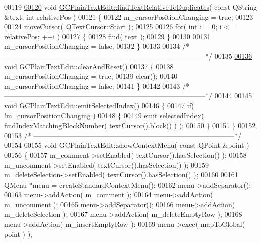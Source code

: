 \begin{DoxyCode}
00119 
\hypertarget{gcplaintextedit_8cpp_source_l00120}{}\hyperlink{class_g_c_plain_text_edit_a9c3603b9e62a7737b8d442da4a16109d}{00120} \textcolor{keywordtype}{void} \hyperlink{class_g_c_plain_text_edit_a9c3603b9e62a7737b8d442da4a16109d}{GCPlainTextEdit::findTextRelativeToDuplicates}( \textcolor{keyword}{const} QString &text, \textcolor{keywordtype}{int} 
      relativePos )
00121 \{
00122   m\_cursorPositionChanging = \textcolor{keyword}{true};
00123 
00124   moveCursor( QTextCursor::Start );
00125 
00126   \textcolor{keywordflow}{for}( \textcolor{keywordtype}{int} i = 0; i <= relativePos; ++i )
00127   \{
00128     find( text );
00129   \}
00130 
00131   m\_cursorPositionChanging = \textcolor{keyword}{false};
00132 \}
00133 
00134 \textcolor{comment}{/*
      --------------------------------------------------------------------------------------*/}
00135 
\hypertarget{gcplaintextedit_8cpp_source_l00136}{}\hyperlink{class_g_c_plain_text_edit_a974f08b952447cec6f1935140d9808b1}{00136} \textcolor{keywordtype}{void} \hyperlink{class_g_c_plain_text_edit_a974f08b952447cec6f1935140d9808b1}{GCPlainTextEdit::clearAndReset}()
00137 \{
00138   m\_cursorPositionChanging = \textcolor{keyword}{true};
00139   clear();
00140   m\_cursorPositionChanging = \textcolor{keyword}{false};
00141 \}
00142 
00143 \textcolor{comment}{/*
      --------------------------------------------------------------------------------------*/}
00144 
00145 \textcolor{keywordtype}{void} GCPlainTextEdit::emitSelectedIndex()
00146 \{
00147   \textcolor{keywordflow}{if}( !m\_cursorPositionChanging )
00148   \{
00149     emit \hyperlink{class_g_c_plain_text_edit_aa318864494827fed57e319302f74ec89}{selectedIndex}( findIndexMatchingBlockNumber( textCursor().block() ) );
00150   \}
00151 \}
00152 
00153 \textcolor{comment}{/*
      --------------------------------------------------------------------------------------*/}
00154 
00155 \textcolor{keywordtype}{void} GCPlainTextEdit::showContextMenu( \textcolor{keyword}{const} QPoint &point )
00156 \{
00157   m\_comment->setEnabled( textCursor().hasSelection() );
00158   m\_uncomment->setEnabled( textCursor().hasSelection() );
00159   m\_deleteSelection->setEnabled( textCursor().hasSelection() );
00160 
00161   QMenu *menu = createStandardContextMenu();
00162   menu->addSeparator();
00163   menu->addAction( m\_comment );
00164   menu->addAction( m\_uncomment );
00165   menu->addSeparator();
00166   menu->addAction( m\_deleteSelection );
00167   menu->addAction( m\_deleteEmptyRow );
00168   menu->addAction( m\_insertEmptyRow );
00169   menu->exec( mapToGlobal( point ) );

\end{DoxyCode}
